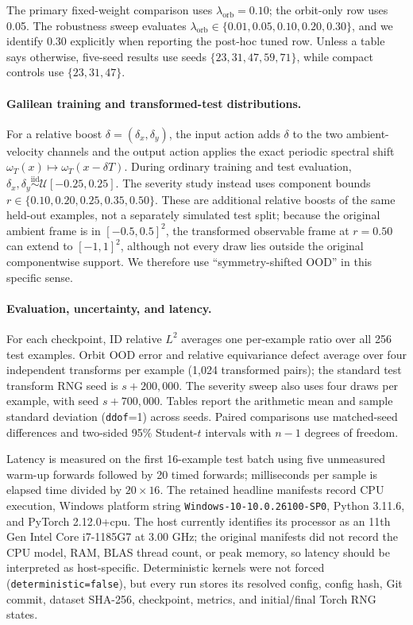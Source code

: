 The primary fixed-weight comparison uses \(\lambda_{\mathrm{orb}}=0.10\); the
orbit-only row uses 0.05.  The robustness sweep evaluates
\(\lambda_{\mathrm{orb}}\in\{0.01,0.05,0.10,0.20,0.30\}\), and we identify 0.30
explicitly when reporting the post-hoc tuned row.  Unless a table says otherwise,
five-seed results use seeds \(\{23,31,47,59,71\}\), while compact controls use
\(\{23,31,47\}\).

\paragraph{Galilean training and transformed-test distributions.}
For a relative boost \(\delta=(\delta_x,\delta_y)\), the input action adds
\(\delta\) to the two ambient-velocity channels and the output action applies the
exact periodic spectral shift \(\omega_T(x)\mapsto\omega_T(x-\delta T)\).
During ordinary training and test evaluation,
\(\delta_x,\delta_y\stackrel{\mathrm{iid}}{\sim}\mathcal U[-0.25,0.25]\).
The severity study instead uses component bounds
\(r\in\{0.10,0.20,0.25,0.35,0.50\}\).  These are additional relative boosts of
the same held-out examples, not a separately simulated test split; because the
original ambient frame is in \([-0.5,0.5]^2\), the transformed observable frame at
\(r=0.50\) can extend to \([-1,1]^2\), although not every draw lies outside the
original componentwise support.  We therefore use ``symmetry-shifted OOD'' in this
specific sense.

\paragraph{Evaluation, uncertainty, and latency.}
For each checkpoint, ID relative \(L^2\) averages one per-example ratio over all
256 test examples.  Orbit OOD error and relative equivariance defect average over
four independent transforms per example (1,024 transformed pairs); the standard
test transform RNG seed is \(s+200{,}000\).  The severity sweep also uses four
draws per example, with seed \(s+700{,}000\).  Tables report the arithmetic mean and
sample standard deviation (\texttt{ddof}=1) across seeds.  Paired comparisons use
matched-seed differences and two-sided 95\% Student-\(t\) intervals with
\(n-1\) degrees of freedom.

Latency is measured on the first 16-example test batch using five unmeasured warm-up
forwards followed by 20 timed forwards; milliseconds per sample is elapsed time
divided by \(20\times16\).  The retained headline manifests record CPU execution,
Windows platform string \texttt{Windows-10-10.0.26100-SP0}, Python 3.11.6, and
PyTorch 2.12.0+cpu.  The host currently identifies its processor as an 11th Gen
Intel Core i7-1185G7 at 3.00 GHz; the original manifests did not record the CPU model,
RAM, BLAS thread count, or peak memory, so latency should be interpreted as
host-specific.  Deterministic kernels were not forced
(\texttt{deterministic=false}), but every run stores its resolved config, config
hash, Git commit, dataset SHA-256, checkpoint, metrics, and initial/final Torch RNG
states.

